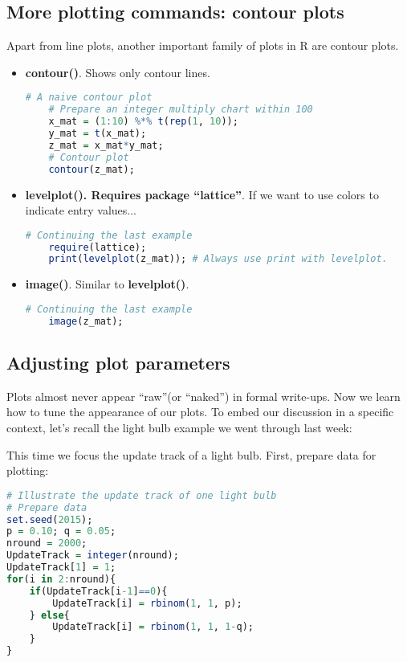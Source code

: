 \documentclass[10pt]{article}
\begin{document}
\subsection{More plotting commands: contour plots}
Apart from line plots, another important family of plots in R are contour plots.
\begin{itemize}
	\item {\bf contour()}. Shows only contour lines.
\begin{lstlisting}[style=displaycode, language=R]
	# A naive contour plot
	# Prepare an integer multiply chart within 100
	x_mat = (1:10) %*% t(rep(1, 10));
	y_mat = t(x_mat);
	z_mat = x_mat*y_mat;
	# Contour plot
	contour(z_mat);
\end{lstlisting}
	\item {\bf levelplot(). Requires package ``lattice''}. If we want to use colors to indicate entry values...
\begin{lstlisting}[style=displaycode, language=R]
	# Continuing the last example
	require(lattice);
	print(levelplot(z_mat)); # Always use print with levelplot.
\end{lstlisting}
	\item {\bf image()}. Similar to {\bf levelplot()}.
\begin{lstlisting}[style=displaycode, language=R]
# Continuing the last example
	image(z_mat);
\end{lstlisting}	
\end{itemize}



\subsection{Adjusting plot parameters}
Plots almost never appear ``raw''(or ``naked'') in formal write-ups. Now we learn how to tune the appearance of our plots. To embed our discussion in a specific context, let's recall the light bulb example we went through last week:

\noindent{}
This time we focus the update track of a light bulb. First, prepare data for plotting:
\begin{lstlisting}[style=displaycode, language=R]
# Illustrate the update track of one light bulb
# Prepare data
set.seed(2015);
p = 0.10; q = 0.05;
nround = 2000;
UpdateTrack = integer(nround);
UpdateTrack[1] = 1;
for(i in 2:nround){
	if(UpdateTrack[i-1]==0){
		UpdateTrack[i] = rbinom(1, 1, p);
	} else{
		UpdateTrack[i] = rbinom(1, 1, 1-q);
	}
}
\end{lstlisting}
\end{document}

